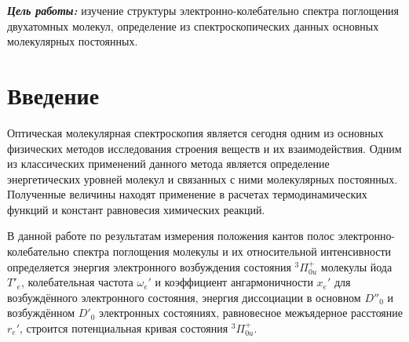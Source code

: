 \begin{center}
\end{center}

\textbf{\emph{Цель работы:}} изучение структуры электронно-колебательно спектра поглощения двухатомных молекул, определение из спектроскопических данных основных молекулярных постоянных.
\section{Введение}
Оптическая молекулярная спектроскопия является сегодня одним из основных физических методов исследования строения веществ и их взаимодействия. Одним из классических применений данного метода является определение энергетических уровней молекул и связанных с ними молекулярных постоянных. Полученные величины находят применение в расчетах термодинамических функций и констант равновесия химических реакций.

В данной работе по результатам измерения положения кантов полос электронно-колебательно спектра поглощения молекулы и их относительной интенсивности определяется энергия электронного возбуждения состояния $^3\Pi^+_{0u}$ молекулы йода $T'_e$, колебательная частота $\omega_e'$ и коэффициент ангармоничности $x_e'$ для возбуждённого электронного состояния, энергия диссоциации в основном $D''_0$ и возбуждённом $D'_0$ электронных состояниях, равновесное межъядерное расстояние $r_e'$, строится потенциальная кривая состояния $^3\Pi^+_{0u}$.

